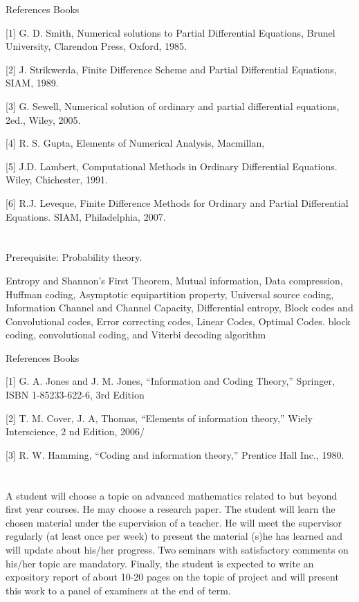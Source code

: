 References Books 

[1] G. D. Smith, Numerical solutions to Partial Differential Equations, Brunel University, Clarendon Press, Oxford, 1985.

[2] J. Strikwerda, Finite Difference Scheme and Partial Differential Equations, SIAM, 1989.

[3] G. Sewell, Numerical solution of ordinary and partial differential equations, 2ed., Wiley, 2005. 

[4] R. S. Gupta, Elements of Numerical Analysis, Macmillan,

[5] J.D. Lambert, Computational Methods in Ordinary Differential Equations. Wiley, Chichester, 1991.

[6] R.J. Leveque, Finite Difference Methods for Ordinary and Partial Differential Equations. SIAM,     Philadelphia, 2007. 


\section{\courseinfo}

Prerequisite: Probability theory.

Entropy and Shannon’s First Theorem, Mutual information, Data compression, Huffman coding, Asymptotic equipartition property, Universal source coding, Information Channel and Channel Capacity, Differential entropy, Block codes and Convolutional codes, Error correcting codes, Linear Codes, Optimal Codes. block coding, convolutional coding, and Viterbi decoding algorithm
 
References Books 
 
 [1] G. A. Jones and J. M. Jones, “Information and Coding Theory,” Springer, ISBN 1-85233-622-6, 3rd Edition
 
 [2] T. M. Cover, J. A, Thomas, “Elements of information theory,” Wiely Interscience, 2 nd Edition, 2006/ 

[3] R. W. Hamming, “Coding and information theory,” Prentice Hall Inc., 1980.




\section{\courseinfo}

A student will choose a topic on advanced mathematics related to but beyond first year courses. He may choose a research paper. The student will learn the chosen material under the supervision of a teacher. He will meet the supervisor regularly (at least once per week) to present the material (s)he has learned and will update about his/her progress. Two seminars with satisfactory comments on his/her topic are mandatory. Finally, the student is expected to write an expository report of about 10-20 pages on the topic of project and will present this work to a panel of examiners at the end of term.   
